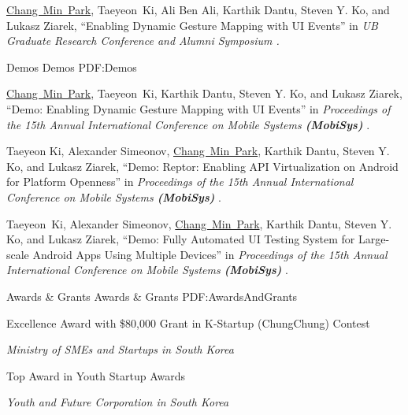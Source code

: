 \documentclass[letterpaper,MMMyyyy,nonstopmode]{simpleresumecv}
\begin{document}
\begin{Body}
\Gap
\NumberedItem{[2]}
\underline{Chang~Min~Park}, Taeyeon~Ki, Ali Ben Ali, Karthik Dantu, Steven Y. Ko, 
and Lukasz Ziarek, 
``Enabling Dynamic Gesture Mapping with UI Events'' in
\textit{UB Graduate Research Conference and Alumni Symposium
.}


\BigGap
\SubSection
{Demos}
{Demos}
{PDF:Demos}

\begingroup
\renewcommand{\MaxNumberedItem}{[88]}

\BigGap
\NumberedItem{[1]}
\underline{Chang~Min~Park}, Taeyeon~Ki, Karthik Dantu, Steven Y. Ko, and Lukasz Ziarek, 
``Demo: Enabling Dynamic Gesture Mapping with UI Events'' in
\textit{Proceedings of the 15th Annual International Conference on Mobile Systems \textbf{(MobiSys)}
}.

\Gap
\NumberedItem{[2]}
Taeyeon Ki, Alexander Simeonov, \underline{Chang~Min~Park}, Karthik Dantu, Steven Y. Ko, 
and Lukasz Ziarek, 
``Demo: Reptor: Enabling API Virtualization on Android for Platform Openness'' in
\textit{Proceedings of the 15th Annual International Conference on Mobile Systems \textbf{(MobiSys)}
}.

\Gap
\NumberedItem{[3]}
Taeyeon~Ki, Alexander Simeonov, \underline{Chang~Min~Park}, Karthik Dantu, 
Steven Y. Ko, and Lukasz Ziarek, 
``Demo: Fully Automated UI Testing System for Large-scale Android Apps Using Multiple 
Devices'' in
\textit{Proceedings of the 15th Annual International Conference on Mobile Systems \textbf{(MobiSys)}
}.



\vspace{1ex}
\Section
{Awards \&\newline
Grants}
{Awards \& Grants}
{PDF:AwardsAndGrants}

\BulletItem
Excellence Award with \$80,000 Grant in K-Startup (ChungChung) Contest 
\hfill
{}
\begin{Detail}
\Item
\textit{Ministry of SMEs and Startups in South Korea}
\end{Detail}

\vspace{0.5ex}

\BulletItem
Top Award in Youth Startup Awards
\hfill
{}
\begin{Detail}
\Item
\textit{Youth and Future Corporation in South Korea}
\end{Detail}
\vspace{0.5ex}


\end{Body}
\end{document}
